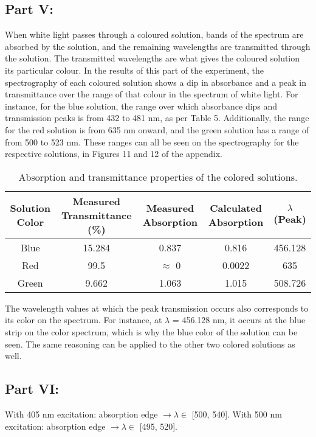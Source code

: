 \documentclass[10pt, letterpaper, twoside]{article}
\begin{document}
\subsection{Part V:}
\vspace{-1em}
When white light passes through a coloured solution, bands of the spectrum are absorbed by the solution, and the remaining wavelengths are transmitted through the solution. The transmitted wavelengths are what gives the coloured solution its particular colour. In the results of this part of the experiment, the spectrography of each coloured solution shows a dip in absorbance and a peak in transmittance over the range of that colour in the spectrum of white light. For instance, for the blue solution, the range over which absorbance dips and transmission peaks is from 432 to 481 nm, as per Table 5. Additionally, the range for the red solution is from 635 nm onward, and the green solution has a range of  from 500 to 523 nm. These ranges can all be seen on the spectrography for the respective solutions, in Figures 11 and 12 of the appendix. 

\begin{table}[!ht]
    \centering
    \begin{tabular}{|c|c|c|c|c|}
        \hline
        Solution Color & Measured Transmittance (\%) & Measured Absorption & Calculated Absorption & $\lambda$ (Peak) \\
        \hline
        Blue & 15.284 & 0.837 & 0.816 & 456.128 \\
        \hline 
        Red & 99.5 & $\approx$ 0 & 0.0022 & 635 \\
        \hline
        Green & 9.662 & 1.063 & 1.015 & 508.726 \\
        \hline
    \end{tabular}
    \caption{Absorption and transmittance properties of the colored solutions.}
    \label{tab:my_label}
\end{table}

The wavelength values at which the peak transmission occurs also corresponds to its color on the spectrum. For instance, at $\lambda$ = 456.128 nm, it occurs at the blue strip on the color spectrum, which is why the blue color of the solution can be seen. The same reasoning can be applied to the other two colored solutions as well.
\vspace{-1em}
\subsection{Part VI:}
\vspace{-1em}
With 405 nm excitation: absorption edge $\rightarrow \lambda \in$ [500, 540]. With 500 nm excitation: absorption edge $\rightarrow \lambda \in$ [495, 520].
\end{document}
